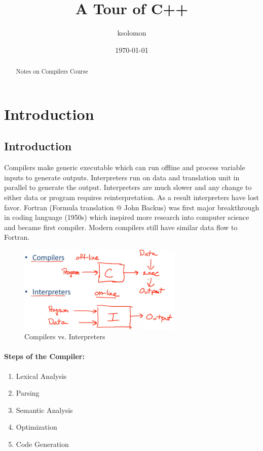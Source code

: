 \documentclass[a4paper, 10pt]{article}
\title{A Tour of C++}
\author{ksolomon}
\date{\today}
\begin{document}
\maketitle

\begin{abstract}
	Notes on Compilers Course
\end{abstract}



\section{Introduction}
\subsection{Introduction}
Compilers make generic executable which can run offline and process variable inputs to generate outputs. Interpreters run on data and translation unit in parallel to generate the output. Interpreters are much slower and any change to either data or program requires reinterpretation. As a result interpreters have lost favor. Fortran (Formula translation @ John Backus) was first major breakthrough in coding language (1950s) which inspired more research into computer science and became first compiler. Modern compilers still have similar data flow to Fortran.
\begin{figure}[ht]
	\centering
	\includegraphics[width=0.7\textwidth]{intro.compilerInterpreter.png}
	\caption{Compilers vs. Interpreters}
\end{figure}

\paragraph{Steps of the Compiler:}
\begin{enumerate}
	\item Lexical Analysis
	\item Parsing
	\item Semantic Analysis
	\item Optimization
	\item Code Generation
\end{enumerate}
\end{document}
